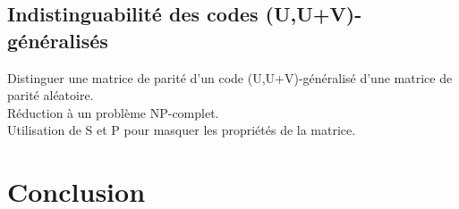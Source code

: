 \documentclass[12pt]{article}
\theoremstyle{definition}
\begin{document}
\subsection{Indistinguabilité des codes (U,U+V)-généralisés}
Distinguer une matrice de parité d'un code (U,U+V)-généralisé d'une matrice de parité aléatoire. \\
Réduction à un problème NP-complet. \\
Utilisation de S et P pour masquer les propriétés de la matrice. \\

\section*{Conclusion}

\newpage




\end{document}

